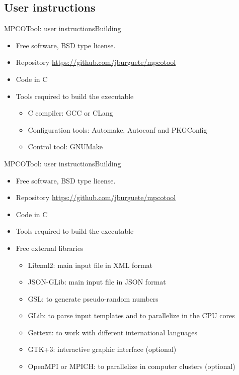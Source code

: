 \documentclass[10pt]{beamer}
\begin{document}
\subsection{User instructions}

\begin{frame}{MPCOTool: user instructions}{Building}
	\begin{itemize}
		\item Free software, BSD type license.
		\item Repository \url{https://github.com/jburguete/mpcotool}
		\item Code in C
		\item Tools required to build the executable
			\begin{itemize}
				\item C compiler: GCC or CLang
				\item Configuration tools: Automake, Autoconf and PKGConfig
				\item Control tool: GNUMake
			\end{itemize}
	\end{itemize}
\end{frame}

\begin{frame}{MPCOTool: user instructions}{Building}
	\begin{itemize}
		\item Free software, BSD type license.
		\item Repository \url{https://github.com/jburguete/mpcotool}
		\item Code in C
		\item Tools required to build the executable
		\item Free external libraries
		\begin{itemize}
			\item Libxml2: main input file in XML format
			\item JSON-GLib: main input file in JSON format
			\item GSL: to generate pseudo-random numbers
			\item GLib: to parse input templates and to parallelize in the CPU cores
			\item Gettext: to work with different international languages
			\item GTK+3: interactive graphic interface (optional)
			\item OpenMPI or MPICH: to parallelize in computer clusters (optional)
		\end{itemize}
	\end{itemize}
\end{frame}
\end{document}
